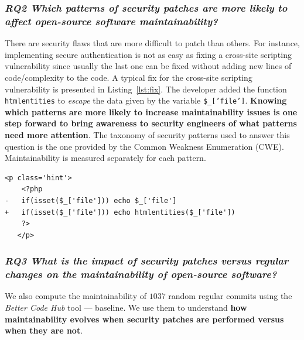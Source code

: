 \documentclass[10pt,conference]{IEEEtran}
\newcounter{lstannotation}
\begin{document}
\subsubsection*{\textit{\textbf{RQ2}  \textbf{Which patterns of security patches are more likely to
affect open-source software maintainability?}}}

There are security flaws that are more difficult to patch than others. For
instance, implementing secure authentication is not as easy as fixing a
cross-site scripting vulnerability since usually the last one can be fixed
without adding new lines of code/complexity to the code. A typical fix for 
the cross-site scripting vulnerability is presented in Listing~\ref{lst:fix}. The developer added the function \texttt{htmlentities} to \textit{escape} the data given by the variable
\texttt{\$\_['file']}. \textbf{Knowing which patterns are more likely to increase
maintainability issues is one step forward to bring awareness to security
engineers of what patterns need more attention}. The taxonomy of security
patterns used to answer this question is the one provided by the Common Weakness Enumeration
(CWE). Maintainability is measured
separately for each pattern.
%
\setcounter{lstannotation}{0}
\begin{lstlisting}[style={PHPStyle}, caption={Fix provided by \texttt{nextcloud/server} developers to a \\Cross-Site Scripting vulnerability},label={lst:fix}]
   <p class='hint'>
    <?php
-   if(isset($_['file'])) echo $_['file']
+   if(isset($_['file'])) echo htmlentities($_['file'])
    ?>
   </p>
\end{lstlisting}
%
\subsubsection*{\textit{\textbf{RQ3} \textbf{What is the impact of security patches versus regular changes on the
maintainability of open-source software?}}}
%
We also compute the maintainability of $1037$ random regular commits using the
\emph{Better Code Hub} tool --- baseline.  We use them to understand \textbf{how
maintainability evolves when security patches are performed versus when
they are not}.
%
\end{document}
